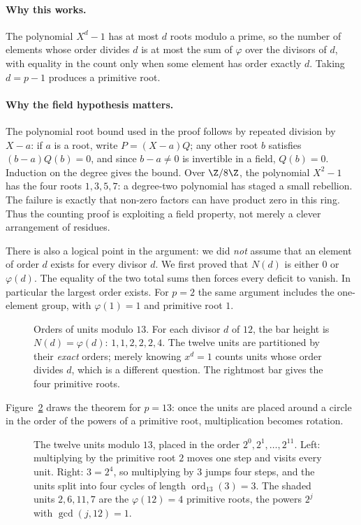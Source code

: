 \paragraph{Why this works.}
The polynomial $X^d-1$ has at most $d$ roots modulo a prime, so the number of elements whose order divides $d$ is at most the sum of $\varphi$ over the divisors of $d$, with equality in the count only when some element has order exactly $d$. Taking $d=p-1$ produces a primitive root.

\paragraph{Why the field hypothesis matters.}
The polynomial root bound used in the proof follows by repeated division by
$X-a$: if $a$ is a root, write $P=(X-a)Q$; any other root $b$ satisfies
$(b-a)Q(b)=0$, and since $b-a\ne0$ is invertible in a field, $Q(b)=0$.
Induction on the degree gives the bound. Over $\Z/8\Z$, the polynomial
$X^2-1$ has the four roots $1,3,5,7$: a degree-two polynomial has staged a
small rebellion. The failure is exactly that non-zero factors can have product
zero in this ring. Thus the counting proof is exploiting a field property,
not merely a clever arrangement of residues.

There is also a logical point in the argument: we did \emph{not} assume that
an element of order $d$ exists for every divisor $d$. We first proved that
$N(d)$ is either $0$ or $\varphi(d)$. The equality of the two total sums then
forces every deficit to vanish. In particular the largest order exists.
For $p=2$ the same argument includes the one-element group, with
$\varphi(1)=1$ and primitive root $1$.

\begin{figure}[ht]
\centering
{}
\caption{Orders of units modulo $13$. For each divisor $d$ of $12$, the bar
height is $N(d)=\varphi(d)$: $1,1,2,2,2,4$. The twelve units are partitioned
by their \emph{exact} orders; merely knowing $x^d=1$ counts units whose order
divides $d$, which is a different question. The rightmost bar gives the four
primitive roots.}
\label{fig:ordercounts}
\end{figure}

Figure~\ref{fig:primroot} draws the theorem for $p=13$: once the units are placed around a circle in the order of the powers of a primitive root, multiplication becomes rotation.

\begin{figure}[ht]
\centering
{}
\caption{The twelve units modulo $13$, placed in the order $2^0,2^1,\dots,2^{11}$. Left: multiplying by the primitive root $2$ moves one step and visits every unit. Right: $3=2^4$, so multiplying by $3$ jumps four steps, and the units split into four cycles of length $\operatorname{ord}_{13}(3)=3$. The shaded units $2,6,11,7$ are the $\varphi(12)=4$ primitive roots, the powers $2^j$ with $\gcd(j,12)=1$.}
\label{fig:primroot}
\end{figure}

